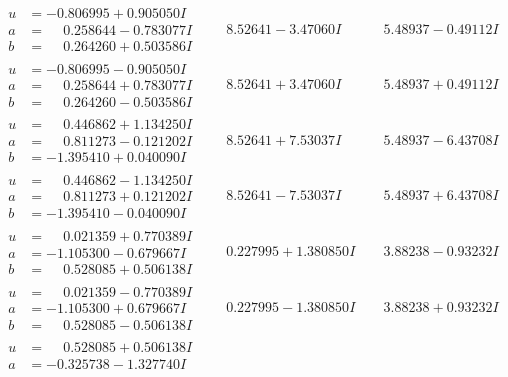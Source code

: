 \documentclass[1p]{elsarticle_modified}
\theoremstyle{definition}
\begin{document}
$$\begin{array}{c|c|c}
\begin{aligned}
u &= -0.806995 + 0.905050 I \\
a &= \phantom{-}0.258644 - 0.783077 I \\
b &= \phantom{-}0.264260 + 0.503586 I\end{aligned}
 & \phantom{-}8.52641 - 3.47060 I & \phantom{-}5.48937 - 0.49112 I \\ \hline\begin{aligned}
u &= -0.806995 - 0.905050 I \\
a &= \phantom{-}0.258644 + 0.783077 I \\
b &= \phantom{-}0.264260 - 0.503586 I\end{aligned}
 & \phantom{-}8.52641 + 3.47060 I & \phantom{-}5.48937 + 0.49112 I \\ \hline\begin{aligned}
u &= \phantom{-}0.446862 + 1.134250 I \\
a &= \phantom{-}0.811273 - 0.121202 I \\
b &= -1.395410 + 0.040090 I\end{aligned}
 & \phantom{-}8.52641 + 7.53037 I & \phantom{-}5.48937 - 6.43708 I \\ \hline\begin{aligned}
u &= \phantom{-}0.446862 - 1.134250 I \\
a &= \phantom{-}0.811273 + 0.121202 I \\
b &= -1.395410 - 0.040090 I\end{aligned}
 & \phantom{-}8.52641 - 7.53037 I & \phantom{-}5.48937 + 6.43708 I \\ \hline\begin{aligned}
u &= \phantom{-}0.021359 + 0.770389 I \\
a &= -1.105300 - 0.679667 I \\
b &= \phantom{-}0.528085 + 0.506138 I\end{aligned}
 & \phantom{-}0.227995 + 1.380850 I & \phantom{-}3.88238 - 0.93232 I \\ \hline\begin{aligned}
u &= \phantom{-}0.021359 - 0.770389 I \\
a &= -1.105300 + 0.679667 I \\
b &= \phantom{-}0.528085 - 0.506138 I\end{aligned}
 & \phantom{-}0.227995 - 1.380850 I & \phantom{-}3.88238 + 0.93232 I \\ \hline\begin{aligned}
u &= \phantom{-}0.528085 + 0.506138 I \\
a &= -0.325738 - 1.327740 I \\

\end{aligned}
\end{array}$$
\end{document}
